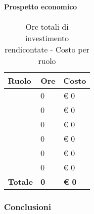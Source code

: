 			\paragraph{Prospetto economico} %
			\label{par:prospetto_economico}
				\begin{table}[!h]
					\begin{center}
						\begin{tabularx}{0.6\textwidth}{|l|l|X|}
							\hline
							\textbf{Ruolo} & \textbf{Ore} & \textbf{Costo} \\
							\hline
							\roleProjectManager & 0 & \euro{} 0 \\
							\hline
							\roleAnalyst & 0 & \euro{} 0 \\
							\hline
							\roleDesigner & 0 & \euro{} 0 \\
							\hline
							\roleAdministrator & 0 & \euro{} 0 \\
							\hline
							\roleProgrammer & 0 & \euro{} 0 \\
							\hline
							\roleVerifier & 0 & \euro{} 0 \\
							\hline
							\textbf{Totale} & \textbf{0} & \textbf{\euro{} 0} \\
							\hline
						\end{tabularx}
					\end{center}
				\caption{Ore totali di investimento rendicontate - Costo per ruolo}
				\end{table}
			
		
		\subsubsection{Conclusioni} %
		\label{ssub:conclusioni}
		
		
	
